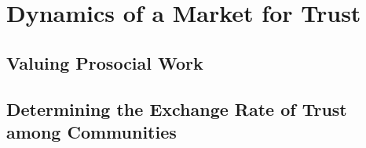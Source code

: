 \section{\textbf{Dynamics of a Market for Trust}}

\subsection{Valuing Prosocial Work}

\subsection{Determining the Exchange Rate of Trust among Communities}


\newpage
\newpage

